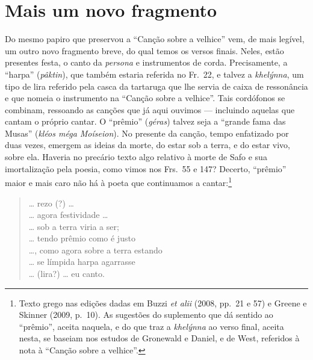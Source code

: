 \chapter{Mais um novo fragmento}

Do mesmo papiro que preservou a ``Canção sobre a velhice'' vem, de mais legível, um outro novo fragmento breve, do qual temos os versos finais. Neles, estão presentes festa, o canto da \textit{persona} e instrumentos de corda. Precisamente, a ``harpa'' (\textit{pâktin}), que também estaria referida no Fr.~22, e talvez a \textit{khelýnna}, um tipo de lira referido pela casca da tartaruga que lhe servia de caixa de ressonância e que nomeia o instrumento na ``Canção sobre a velhice''.
Tais cordófonos se combinam, ressoando as canções que já aqui ouvimos --- incluindo aquelas que cantam o próprio cantar. O ``prêmio'' (\textit{géras}) talvez seja a ``grande fama das Musas'' (\textit{kléos méga Moíseion}). No presente da canção, tempo enfatizado por duas vezes, emergem as ideias da morte, do estar sob a terra, e do estar vivo, sobre ela. Haveria no precário texto algo relativo à morte de Safo e sua imortalização pela poesia, como vimos nos Frs.~55 e 147? Decerto, ``prêmio'' maior e mais caro não há à poeta que continuamos a cantar:\footnote{Texto grego nas edições dadas em Buzzi \textit{et alii} (2008, pp.~21 e 57) e Greene e Skinner (2009, p.~10). As sugestões do suplemento que dá sentido ao ``prêmio'', aceita naquela, e do que traz a \textit{khelýnna} ao verso final, aceita nesta, se baseiam nos estudos de Gronewald e Daniel, e de West, referidos à nota à ``Canção sobre a velhice''.}


\begin{verse}
\ldots{} rezo (?) \ldots{}\\
\ldots{} agora festividade \ldots{}\\
\ldots{} sob a terra viria a ser;\\
\ldots{} tendo prêmio como é justo\\
\ldots{}, como agora sobre a terra estando\\
\ldots{} se límpida harpa agarrasse\\
\ldots{} (lira?) \ldots{} eu canto.
\end{verse}


